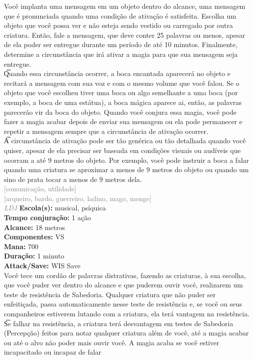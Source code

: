 \documentclass{RPG_Adventure}[2021/10/20]
\begin{document}
{\normalsize Você implanta uma mensagem em um objeto dentro do alcance, uma mensagem que é pronunciada quando uma condição de ativação é satisfeita. Escolha um objeto que você possa ver e não esteja sendo vestido ou carregado por outra criatura. Então, fale a mensagem, que deve conter 25 palavras ou menos, apesar de ela poder ser entregue durante um período de até 10 minutos. Finalmente, determine a circunstância que irá ativar a magia para que sua mensagem seja entregue.\\\t Quando essa circunstância ocorrer, a boca encantada aparecerá no objeto e recitará a mensagem com sua voz e com o mesmo volume que você falou. Se o objeto que você escolheu tiver uma boca ou algo semelhante a uma boca (por exemplo, a boca de uma estátua), a boca mágica aparece ai, então, as palavras parecerão vir da boca do objeto. Quando você conjura essa magia, você pode fazer a magia acabar depois de enviar sua mensagem ou ela pode permanecer e repetir a mensagem sempre que a circunstância de ativação ocorrer.\\\t A circunstância de ativação pode ser tão genérica ou tão detalhada quando você quiser, apesar de ela precisar ser baseada em condições visuais ou audíveis que ocorram a até 9 metros do objeto. Por exemplo, você pode instruir a boca a falar quando uma criatura se aproximar a menos de 9 metros do objeto ou quando um sino de prata tocar a menos de 9 metros dela.\\}
{\scriptsize \textcolor{gray}{[comunicação, utilidade]\\}}
{\scriptsize \textcolor{gray}{[arqueiro, bardo, guerreiro, ladino, mago, monge]\\}}
{\tiny \textcolor{gray}{\textit{LDJ}}}\jump{}
{\small \t \textbf{Escola(s):} musical, psíquica\\\t \textbf{Tempo conjuração:} 1 ação\\\t \textbf{Alcance:} 18 metros\\\t \textbf{Componentes:} VS\\\t \textbf{Mana:} 700\\\t \textbf{Duração:} 1 minuto\\\t \textbf{Attack/Save:} WIS Save\\}
{\normalsize Você tece um cordão de palavras distrativas, fazendo as criaturas, à sua escolha, que você puder ver dentro do alcance e que puderem ouvir você, realizarem um teste de resistência de Sabedoria. Qualquer criatura que não puder ser enfeitiçada, passa automaticamente nesse teste de resistência e, se você ou seus companheiros estiverem lutando com a criatura, ela terá vantagem na resistência.\\\t Se falhar na resistência, a criatura terá desvantagem em testes de Sabedoria (Percepção) feitos para notar qualquer criatura além de você, até a magia acabar ou até o alvo não poder mais ouvir você. A magia acaba se você estiver incapacitado ou incapaz de falar\\}
\end{document}

